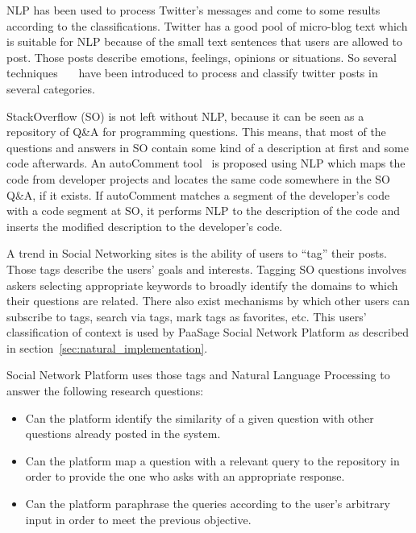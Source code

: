 NLP has been used to process Twitter's messages and come to some results according to the classifications. Twitter has a good pool of micro-blog text which is suitable for NLP because of the small text sentences that users are allowed to post. Those posts describe emotions, feelings, opinions or situations. So several techniques~\cite{pak2010twitter}~\cite{verma2011natural}~\cite{go2009twitter} have been introduced to process and classify twitter posts in several categories.

StackOverflow (SO) is not left without NLP, because it can be seen as a repository of Q\&A for programming questions. This means, that most of the questions and answers in SO contain some kind of a description at first and some code afterwards.    
An autoComment tool~\cite{wong2013autocomment} is proposed using NLP which maps the code from developer projects and locates the same code somewhere in the SO Q\&A, if it exists. If autoComment matches a segment of the developer's code with a code segment at SO, it performs NLP to the description of the code and inserts the modified description to the developer's code. 

A trend in Social Networking sites is the ability of users to ``tag'' their posts. Those tags describe the users' goals and interests. Tagging SO questions involves askers selecting appropriate keywords to broadly identify the domains
to which their questions are related. There also exist mechanisms by which other users can subscribe to tags, search via
tags, mark tags as favorites, etc. This users' classification of context is used by PaaSage Social Network Platform as described in section~\ref{sec:natural_implementation}. 

Social Network Platform uses those tags and Natural Language Processing to answer the following research questions:
\begin{itemize}
\item Can the platform identify the similarity of a given question with other questions already posted in the system.
\item Can the platform map a question with a relevant query to the repository in order to provide the one who asks with an appropriate response.
\item Can the platform paraphrase the queries according to the user's arbitrary input in order to meet the previous objective. 
\end{itemize}

